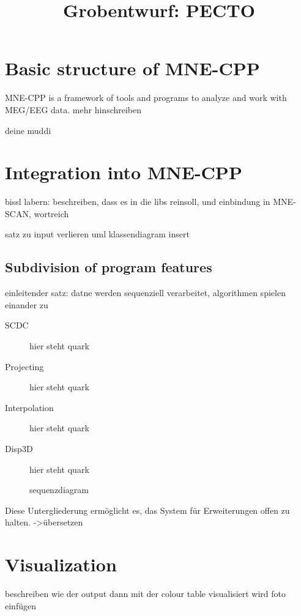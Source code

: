 \documentclass[a4paper, 11pt, ngerman, fleqn]{article}
\begin{document}
	
\title{Grobentwurf: PECTO}
\vspace{3 in}
\maketitle
\clearpage

\tableofcontents

\clearpage
\section{Basic structure of MNE-CPP}

MNE-CPP is a framework of tools and programs to analyze and work with MEG/EEG data.
mehr hinschreiben 

\begin{description}
	\item[deine muddi]

\end{description}

\clearpage

\section{Integration into MNE-CPP}

bissl labern: beschreiben, dass es in die libs reinsoll, und einbindung in MNE-SCAN, wortreich


satz zu input verlieren
uml klassendiagram insert

\subsection{Subdivision of program features}

einleitender satz: datne werden sequenziell verarbeitet, algorithmen spielen einander zu

\begin{description}
	
	\item[SCDC] 
	hier steht quark
	
	\item[Projecting]
	hier steht quark
	
	\item[Interpolation]
	hier steht quark
	
	\item[Disp3D]
	hier steht quark
	

sequenzdiagram
	
\end{description}

Diese Untergliederung ermöglicht es, das System für Erweiterungen offen zu halten. ->übersetzen


\clearpage


\section{Visualization}
beschreiben wie der output dann mit der colour table visualisiert wird
foto einfügen



\clearpage
  
\end{document}
